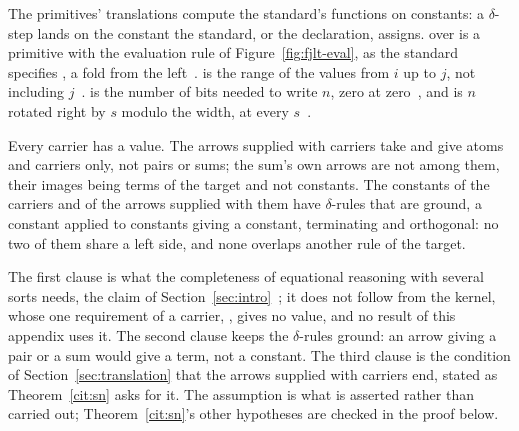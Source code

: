 \begin{assumption}
\label{def:standard}
The primitives' translations compute the standard's functions on constants: a $\delta$-step lands on the constant the standard, or the declaration, assigns.
 over  is a primitive with the evaluation rule of Figure~\ref{fig:fjlt-eval}, as the standard specifies , a fold from the left~\cite[{\texttt{alg.fold}}]{cpp23standard}.
 is the range of the values from $i$ up to $j$, not including $j$~\cite[{\texttt{range.iota}}]{cpp23standard}.
 is the number of bits needed to write $n$, zero at zero~\cite[{\texttt{bit.pow.two}}]{cpp23standard}, and  is $n$ rotated right by $s$ modulo the width, at every $s$~\cite[{\texttt{bit.rotate}}]{cpp23standard}.
\end{assumption}

\begin{assumption}
\label{ass:instance}
Every carrier has a value.
The arrows supplied with carriers take and give atoms and carriers only, not pairs or sums; the sum's own arrows are not among them, their images being terms of the target and not constants.
The constants of the carriers and of the arrows supplied with them have $\delta$-rules that are ground, a constant applied to constants giving a constant, terminating and orthogonal: no two of them share a left side, and none overlaps another rule of the target.
\end{assumption}

The first clause is what the completeness of equational reasoning with several sorts needs, the claim of Section~\ref{sec:intro}~\cite{goguen1985completeness}; it does not follow from the kernel, whose one requirement of a carrier, , gives no value, and no result of this appendix uses it.
The second clause keeps the $\delta$-rules ground: an arrow giving a pair or a sum would give a term, not a constant.
The third clause is the condition of Section~\ref{sec:translation} that the arrows supplied with carriers end, stated as Theorem~\ref{cit:sn} asks for it.
The assumption is what is asserted rather than carried out; Theorem~\ref{cit:sn}'s other hypotheses are checked in the proof below.

